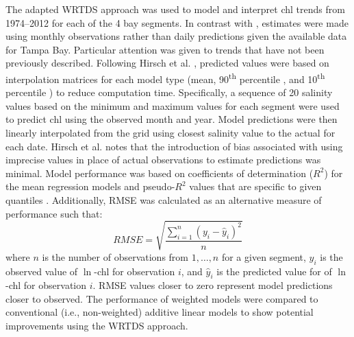 \documentclass{svjour3}\usepackage[]{graphicx}\usepackage[]{color}
\newcommand{\nine}{90\textsuperscript{th} percentile }
\newcommand{\ten}{10\textsuperscript{th} percentile }
\begin{document}
The adapted \ac{WRTDS} approach was used to model and interpret \ac{chl} trends from 1974--2012 for each of the 4 bay segments.  In contrast with \cite{Hirsch10}, estimates were made using monthly observations rather than daily predictions given the available data for Tampa Bay.  Particular attention was given to trends that have not been previously described.  Following Hirsch et al. \cite{Hirsch10}, predicted values were based on interpolation matrices for each model type (mean, \nine, and \ten) to reduce computation time.  Specifically, a sequence of 20 salinity values based on the minimum and maximum values for each segment were used to predict \ac{chl} using the observed month and year.  Model predictions were then linearly interpolated from the grid using closest salinity value to the actual for each date.  Hirsch et al. \cite{Hirsch10} notes that the introduction of bias associated with using imprecise values in place of actual observations to estimate predictions was minimal.  Model performance was based on coefficients of determination ($R^2$) for the mean regression models and pseudo-$R^2$ values that are specific to given quantiles \cite{Koenker99}.  Additionally, \ac{RMSE} was calculated as an alternative measure of performance such that:
\begin{equation}
RMSE = \sqrt {{\frac{{\sum\limits_{{i = 1}}^n {{{\left( {{y_i} - {{\hat{y}}_i}} \right)}^2}} }}{{n}}}}
\end{equation}
\noindent where $n$ is the number of observations from $1,\ldots,n$ for a given segment, $y_i$ is the observed value of $\ln$-\ac{chl} for observation $i$, and ${\hat{y}}_i$ is the predicted value for of $\ln$-\ac{chl} for observation $i$.  \ac{RMSE} values closer to zero represent model predictions closer to observed. The performance of weighted models were compared to conventional (i.e., non-weighted) additive linear models to show potential improvements using the \ac{WRTDS} approach.   
\end{document}

